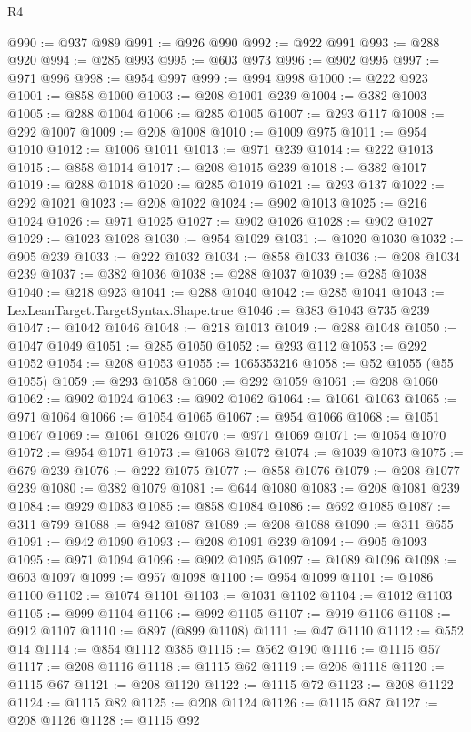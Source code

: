 \begin{lexlean}{R4}
\begin{coremodule}
@990 := @937 @989
@991 := @926 @990
@992 := @922 @991
@993 := @288 @920
@994 := @285 @993
@995 := @603 @973
@996 := @902 @995
@997 := @971 @996
@998 := @954 @997
@999 := @994 @998
@1000 := @222 @923
@1001 := @858 @1000
@1003 := @208 @1001 @239
@1004 := @382 @1003
@1005 := @288 @1004
@1006 := @285 @1005
@1007 := @293 @117
@1008 := @292 @1007
@1009 := @208 @1008
@1010 := @1009 @975
@1011 := @954 @1010
@1012 := @1006 @1011
@1013 := @971 @239
@1014 := @222 @1013
@1015 := @858 @1014
@1017 := @208 @1015 @239
@1018 := @382 @1017
@1019 := @288 @1018
@1020 := @285 @1019
@1021 := @293 @137
@1022 := @292 @1021
@1023 := @208 @1022
@1024 := @902 @1013
@1025 := @216 @1024
@1026 := @971 @1025
@1027 := @902 @1026
@1028 := @902 @1027
@1029 := @1023 @1028
@1030 := @954 @1029
@1031 := @1020 @1030
@1032 := @905 @239
@1033 := @222 @1032
@1034 := @858 @1033
@1036 := @208 @1034 @239
@1037 := @382 @1036
@1038 := @288 @1037
@1039 := @285 @1038
@1040 := @218 @923
@1041 := @288 @1040
@1042 := @285 @1041
@1043 := LexLeanTarget.TargetSyntax.Shape.true
@1046 := @383 @1043 @735 @239
@1047 := @1042 @1046
@1048 := @218 @1013
@1049 := @288 @1048
@1050 := @1047 @1049
@1051 := @285 @1050
@1052 := @293 @112
@1053 := @292 @1052
@1054 := @208 @1053
@1055 := 1065353216
@1058 := @52 @1055 (@55 @1055)
@1059 := @293 @1058
@1060 := @292 @1059
@1061 := @208 @1060
@1062 := @902 @1024
@1063 := @902 @1062
@1064 := @1061 @1063
@1065 := @971 @1064
@1066 := @1054 @1065
@1067 := @954 @1066
@1068 := @1051 @1067
@1069 := @1061 @1026
@1070 := @971 @1069
@1071 := @1054 @1070
@1072 := @954 @1071
@1073 := @1068 @1072
@1074 := @1039 @1073
@1075 := @679 @239
@1076 := @222 @1075
@1077 := @858 @1076
@1079 := @208 @1077 @239
@1080 := @382 @1079
@1081 := @644 @1080
@1083 := @208 @1081 @239
@1084 := @929 @1083
@1085 := @858 @1084
@1086 := @692 @1085
@1087 := @311 @799
@1088 := @942 @1087
@1089 := @208 @1088
@1090 := @311 @655
@1091 := @942 @1090
@1093 := @208 @1091 @239
@1094 := @905 @1093
@1095 := @971 @1094
@1096 := @902 @1095
@1097 := @1089 @1096
@1098 := @603 @1097
@1099 := @957 @1098
@1100 := @954 @1099
@1101 := @1086 @1100
@1102 := @1074 @1101
@1103 := @1031 @1102
@1104 := @1012 @1103
@1105 := @999 @1104
@1106 := @992 @1105
@1107 := @919 @1106
@1108 := @912 @1107
@1110 := @897 (@899 @1108)
@1111 := @47 @1110
@1112 := @552 @14
@1114 := @854 @1112 @385
@1115 := @562 @190
@1116 := @1115 @57
@1117 := @208 @1116
@1118 := @1115 @62
@1119 := @208 @1118
@1120 := @1115 @67
@1121 := @208 @1120
@1122 := @1115 @72
@1123 := @208 @1122
@1124 := @1115 @82
@1125 := @208 @1124
@1126 := @1115 @87
@1127 := @208 @1126
@1128 := @1115 @92

\end{coremodule}
\end{lexlean}
